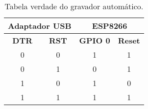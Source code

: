 \begin{table}[H]
    \centering
    \caption[Tabela verdade do gravador automático]{Tabela verdade do gravador automático.
    \label{tab:gravador}}
\begin{tabular}{|c|c|c|c|}
\hline
\multicolumn{2}{|c|}{\textbf{Adaptador USB}} & \multicolumn{2}{c|}{\textbf{ESP8266}} \\ \hline
\textbf{DTR} & \textbf{RST} & \textbf{GPIO 0} & \textbf{Reset} \\ \hline
0 & 0 & 1 & 1 \\ \hline
0 & 1 & 0 & 1 \\ \hline
1 & 0 & 1 & 0 \\ \hline
1 & 1 & 1 & 1 \\ \hline
\end{tabular}
\end{table}
